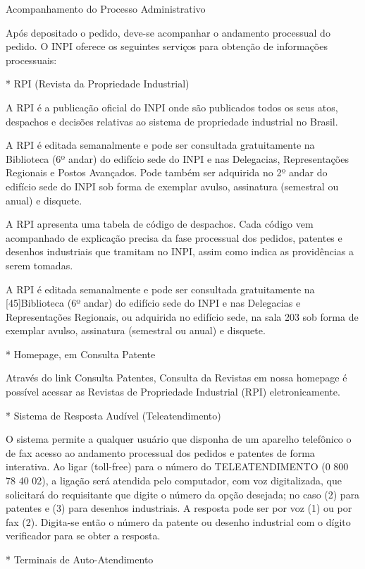 \documentclass[12pt]{article}
\begin{document}
 
 Acompanhamento do Processo Administrativo
 
 Após depositado o pedido, deve-se acompanhar o andamento processual
 do pedido. O INPI oferece os seguintes serviços para obtenção de
 informações processuais:
 
 * RPI (Revista da Propriedade Industrial)
 
 A RPI é a publicação oficial do INPI onde são publicados todos os
 seus atos, despachos e decisões relativas ao sistema de propriedade
 industrial no Brasil.
 
 A RPI é editada semanalmente e pode ser consultada gratuitamente na
 Biblioteca (6º andar) do edifício sede do INPI e nas Delegacias,
 Representações Regionais e Postos Avançados. Pode também ser
 adquirida no 2º andar do edifício sede do INPI sob forma de exemplar
 avulso, assinatura (semestral ou anual) e disquete.
 
 A RPI apresenta uma tabela de código de despachos. Cada código vem
 acompanhado de explicação precisa da fase processual dos pedidos,
 patentes e desenhos industriais que tramitam no INPI, assim como
 indica as providências a serem tomadas.
 
 A RPI é editada semanalmente e pode ser consultada gratuitamente na
 [45]Biblioteca (6º andar) do edifício sede do INPI e nas Delegacias e
 Representações Regionais, ou adquirida no edifício sede, na sala 203
 sob forma de exemplar avulso, assinatura (semestral ou anual) e
 disquete.
 
 * Homepage, em Consulta Patente
 
 Através do link Consulta Patentes, Consulta da Revistas em nossa
 homepage é possível acessar as Revistas de Propriedade Industrial
 (RPI) eletronicamente.
 
 * Sistema de Resposta Audível (Teleatendimento)
 
 O sistema permite a qualquer usuário que disponha de um aparelho
 telefônico o de fax acesso ao andamento processual dos pedidos e
 patentes de forma interativa. Ao ligar (toll-free) para o número do
 TELEATENDIMENTO (0 800 78 40 02), a ligação será atendida pelo
 computador, com voz digitalizada, que solicitará do requisitante que
 digite o número da opção desejada; no caso (2) para patentes e (3)
 para desenhos industriais. A resposta pode ser por voz (1) ou por fax
 (2). Digita-se então o número da patente ou desenho industrial com o
 dígito verificador para se obter a resposta.

     * Terminais de Auto-Atendimento
     
\end{document}
